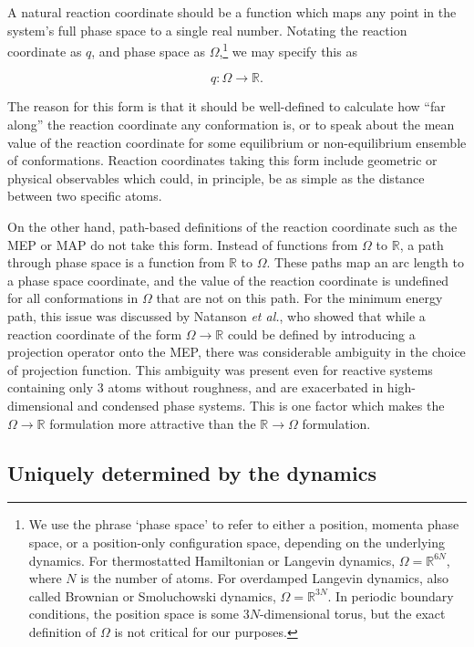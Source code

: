 \documentclass[aip, jcp, reprint, nolinenumbers, twocolumn, nobalancelastpage]{revtex4-1}
\begin{document}
A natural reaction coordinate should be a function which maps any point in the system's full phase space to a single real number. Notating the reaction coordinate as $q$, and phase space as $\Omega$,\footnote{We use the phrase `phase space' to refer to either a position, momenta phase space, or a position-only configuration space, depending on the underlying dynamics. For thermostatted Hamiltonian or Langevin dynamics, $\Omega=\mathbb{R}^{6N}$, where $N$ is the number of atoms. For overdamped Langevin dynamics, also called Brownian or Smoluchowski dynamics, $\Omega=\mathbb{R}^{3N}$. In periodic boundary conditions, the position space is some $3N$-dimensional torus, but the exact definition of $\Omega$ is not critical for our purposes.} we may specify this as

$$
q : \Omega \rightarrow \mathbb{R}.
$$

The reason for this form is that it should be well-defined to calculate how ``far along'' the reaction coordinate any conformation is, or to speak about the mean value of the reaction coordinate for some equilibrium or non-equilibrium ensemble of conformations. Reaction coordinates taking this form include geometric or physical observables which could, in principle, be as simple as the distance between two specific atoms.

On the other hand, path-based definitions of the reaction coordinate such as the MEP or MAP do not take this form. Instead of functions from $\Omega$ to $\mathbb{R}$, a path through phase space is a function from $\mathbb{R}$ to $\Omega$. These paths map an arc length to a phase space coordinate, and the value of the reaction coordinate is undefined for all conformations in $\Omega$ that are not on this path. For the minimum energy path, this issue was discussed by Natanson \emph{et al.}, \cite{natanson1991definition} who showed that while a reaction coordinate of the form $\Omega \rightarrow \mathbb{R}$ could be defined by introducing a projection operator onto the MEP, there was considerable ambiguity in the choice of projection function. This ambiguity was present even for reactive systems containing only 3 atoms without roughness, and are exacerbated in high-dimensional and condensed phase systems. This is one factor which makes the $\Omega \rightarrow \mathbb{R}$ formulation more attractive than the $\mathbb{R} \rightarrow \Omega$ formulation.

\subsection{Uniquely determined by the dynamics}
\label{sect:uniquely_dertmined}
\end{document}
